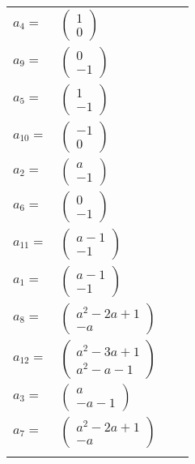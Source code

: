\documentclass[1p]{elsarticle_modified}
\theoremstyle{definition}
\begin{document}
\begin{tabular}{m{7pt} m{180pt} m{7pt} m{180pt} }
\flushright $a_{4}=$&$\begin{pmatrix}1\\0\end{pmatrix}$ \\
\flushright $a_{9}=$&$\begin{pmatrix}0\\-1\end{pmatrix}$ \\
\flushright $a_{5}=$&$\begin{pmatrix}1\\-1\end{pmatrix}$ \\
\flushright $a_{10}=$&$\begin{pmatrix}-1\\0\end{pmatrix}$ \\
\flushright $a_{2}=$&$\begin{pmatrix}a\\-1\end{pmatrix}$ \\
\flushright $a_{6}=$&$\begin{pmatrix}0\\-1\end{pmatrix}$ \\
\flushright $a_{11}=$&$\begin{pmatrix}a-1\\-1\end{pmatrix}$ \\
\flushright $a_{1}=$&$\begin{pmatrix}a-1\\-1\end{pmatrix}$ \\
\flushright $a_{8}=$&$\begin{pmatrix}a^2-2 a+1\\- a\end{pmatrix}$ \\
\flushright $a_{12}=$&$\begin{pmatrix}a^2-3 a+1\\a^2- a-1\end{pmatrix}$ \\
\flushright $a_{3}=$&$\begin{pmatrix}a\\- a-1\end{pmatrix}$ \\
\flushright $a_{7}=$&$\begin{pmatrix}a^2-2 a+1\\- a\end{pmatrix}$\\&\end{tabular}
\end{document}
